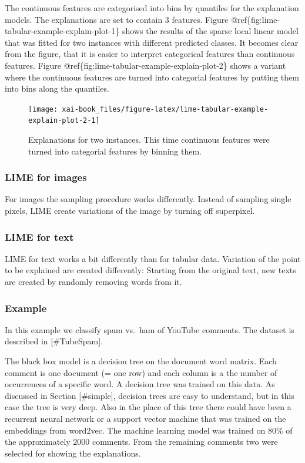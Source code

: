 \documentclass[12pt,]{krantz}
\theoremstyle{definition}
\theoremstyle{definition}
\theoremstyle{definition}
\theoremstyle{remark}
\begin{document}
The continuous features are categorised into bins by quantiles for the
explanation models. The explanations are set to contain 3 features.
Figure @ref\{fig:lime-tabular-example-explain-plot-1\} shows the results
of the sparse local linear model that was fitted for two instances with
different predicted classes. It becomes clear from the figure, that it
is easier to interpret categorical features than continuous features.
Figure @ref\{fig:lime-tabular-example-explain-plot-2\} shows a variant
where the continuous features are turned into categorial features by
putting them into bins along the quantiles.

\begin{figure}

{\centering \texttt{[image: xai-book\_files/figure-latex/lime-tabular-example-explain-plot-2-1]} 

}

\caption{Explanations for two instances. This time continuous features were turned into categorial features by binning them.}\label{fig:lime-tabular-example-explain-plot-2}
\end{figure}

\subsubsection{LIME for images}\label{lime-for-images}

For images the sampling procedure works differently. Instead of sampling
single pixels, LIME create variations of the image by turning off
superpixel.

\subsubsection{LIME for text}\label{lime-for-text}

LIME for text works a bit differently than for tabular data. Variation
of the point to be explained are created differently: Starting from the
original text, new texts are created by randomly removing words from it.

\subsubsection{Example}\label{example-4}

In this example we classify spam vs.~ham of YouTube comments. The
dataset is described in {[}\#TubeSpam{]}.

The black box model is a decision tree on the document word matrix. Each
comment is one document (= one row) and each column is a the number of
occurrences of a specific word. A decision tree was trained on this
data. As discussed in Section {[}\#simple{]}, decision trees are easy to
understand, but in this case the tree is very deep. Also in the place of
this tree there could have been a recurrent neural network or a support
vector machine that was trained on the embeddings from word2vec. The
machine learning model was trained on 80\% of the approximately 2000
comments. From the remaining comments two were selected for showing the
explanations.
\end{document}
